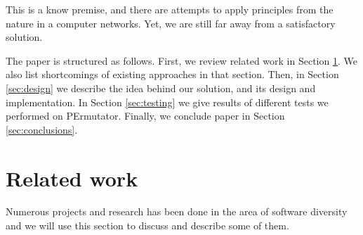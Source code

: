 \documentclass[11pt,final,conference,a4paper]{IEEEtran}
\begin{document}
This is a know premise, and there are attempts to apply principles
from the nature in a computer networks. Yet, we are still far away
from a satisfactory solution.

The paper is structured as follows. First, we review related work
in Section \ref{sec:architecture}. We also list shortcomings of
existing approaches in that section. Then, in Section \ref{sec:design}
we describe the idea behind our solution, and its design and
implementation. In Section \ref{sec:testing} we give results of
different tests we performed on PErmutator. Finally, we conclude
paper in Section \ref{sec:conclusions}.

\section{Related work}
\label{sec:architecture}
Numerous projects and research has been done in the area of software diversity and we will use this section to discuss and describe some of them.
\end{document}

